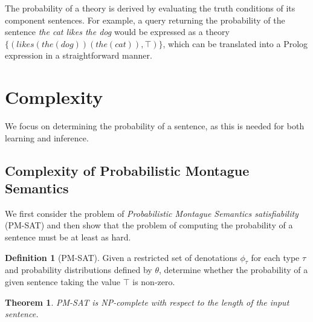 \documentclass[a4paper,11pt]{article}
\newtheorem*{theorem}{Theorem}
\theoremstyle{definition}
\newtheorem*{definition}{Definition}
\newcommand{\hide}[1]{}
\begin{document}
The probability of a theory is derived by evaluating the truth
conditions of its component sentences.
For example, a query returning the
probability of the sentence {\em the cat likes the dog\/} would be
expressed as a theory
$\{(\mathit{likes}(\mathit{the}(\mathit{dog}))(\mathit{the}(\mathit{cat})),\top)\}$,
which can be translated into a Prolog expression in a straightforward
manner.


\section{Complexity}

We focus on determining the probability of a sentence,
as this is needed for both learning and inference.

\subsection{Complexity of Probabilistic Montague Semantics}

We first consider the problem of {\em Probabilistic Montague Semantics satisfiability\/} (PM-SAT) and then show that the problem of computing the probability of a sentence must be at least as hard.

\begin{definition}[PM-SAT]

  Given 
  a restricted set of
  denotations $\phi_\tau$ for each type $\tau$ and probability
  distributions defined by $\theta$, determine whether the probability
  of a given sentence taking the value $\top$ is non-zero.
\end{definition}

\begin{theorem}
  \emph{PM-SAT} is NP-complete with respect to the length of the input
  sentence.
\end{theorem}
\end{document}
